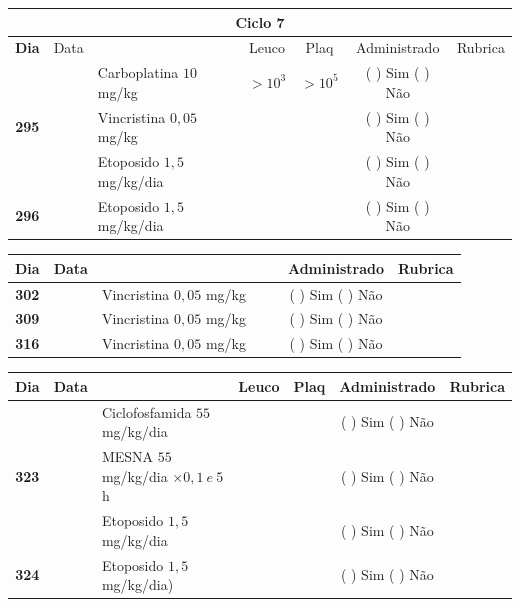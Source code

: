 \documentclass[11pt,a4paper,oldfontcommands]{memoir}
\begin{document}
\begin{center}
\begin{longtable}{p{1cm}c|p{5cm}|p{1.5cm}p{1.5cm}|c|c}
	\hline
	\multicolumn{7}{c}{Ciclo 7} \\
	\hline
	\multicolumn{1}{c|}{\multirow{1}{*}{\textbf{Dia}}}&{Data}&{}&\multicolumn{1}{c|}{Leuco}&\multicolumn{1}{c|}{Plaq}&{Administrado}&{Rubrica} \\
    \hline
    \multicolumn{1}{c|}{\multirow{3}{*}{\textbf{295}}}&\multirow{2}{*}{}&{Carboplatina \(10\) mg/kg}&\multicolumn{1}{c|}{\(>10^3\)}&\multicolumn{1}{c|}{\(>10^5\)}&{(  ) Sim (  ) Não}&\\
    \cline{4-5}
    \multicolumn{1}{c|}{}&&{Vincristina \(0,05\) mg/kg}&\multicolumn{1}{c|}{}&&{(  ) Sim (  ) Não}&\\
    \cline{4-5}
    \multicolumn{1}{c|}{}&\multirow{1}{*}{}&{Etoposido \(1,5\) mg/kg/dia}&{}&&{(  ) Sim (  ) Não}&\\
    \cline{1-3}\cline{6-6}
    \multicolumn{1}{c|}{\textbf{296}}&\multirow{1}{*}{}&{Etoposido \(1,5\) mg/kg/dia}&{}&&{(  ) Sim (  ) Não}&\\
    \hline
\end{longtable}
\begin{longtable}{p{1cm}c|p{4cm}|p{2cm}p{2cm}|c|c}
	\hline
	\multicolumn{1}{c|}{\multirow{1}{*}{\textbf{Dia}}}&{Data}&{}&{}&&{Administrado}&{Rubrica} \\
    \hline
    \multicolumn{1}{c|}{\textbf{302}}&&{Vincristina \(0,05\) mg/kg}&\multicolumn{1}{c}{}&&{(  ) Sim (  ) Não}&\\
    \hline
    \multicolumn{1}{c|}{\textbf{309}}&&{Vincristina \(0,05\) mg/kg}&\multicolumn{1}{c}{}&&{(  ) Sim (  ) Não}&\\
    \hline
    \multicolumn{1}{c|}{\textbf{316}}&&{Vincristina \(0,05\) mg/kg}&\multicolumn{1}{c}{}&&{(  ) Sim (  ) Não}&\\
    \hline
\end{longtable}

\begin{longtable}{p{1cm}c|p{5cm}|p{1.5cm}p{1.5cm}|c|c}
	\hline
	\multicolumn{1}{c|}{\multirow{1}{*}{\textbf{Dia}}}&{Data}&{}&\multicolumn{1}{c|}{Leuco}&\multicolumn{1}{c|}{Plaq}&{Administrado}&{Rubrica} \\
    \hline
    \multicolumn{1}{c|}{\multirow{3}{*}{\textbf{323}}}&&{Ciclofosfamida \(55\) mg/kg/dia}&\multicolumn{1}{c|}{}&&{(  ) Sim (  ) Não}&\\
    \cline{4-5}
    \multicolumn{1}{c|}{}&&{MESNA \(55\) mg/kg/dia \(\times 0,1 \:e\: 5\)h}&&&{(  ) Sim (  ) Não}&\\
    \multicolumn{1}{c|}{}&&{Etoposido \(1,5\) mg/kg/dia}&&&{(  ) Sim (  ) Não}&\\
    \hline
    \multicolumn{1}{c|}{\multirow{1}{*}{\textbf{324}}}&&{Etoposido \(1,5\) mg/kg/dia)}&{}&&{(  ) Sim (  ) Não}&\\
    \hline
\end{longtable}
\end{center}
\end{document}
